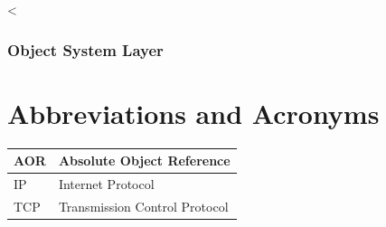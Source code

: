 <\documentclass[a4paper]{article}
\begin{document}
\subsubsection{Object System Layer}

\section{Abbreviations and Acronyms}

	\begin{tabular}{|l|l|}
	\hline
	AOR & Absolute Object Reference\\
	\hline
	IP & Internet Protocol\\
	\hline
	TCP & Transmission Control Protocol\\
	\hline
	\end{tabular}

\newpage


\end{document}
